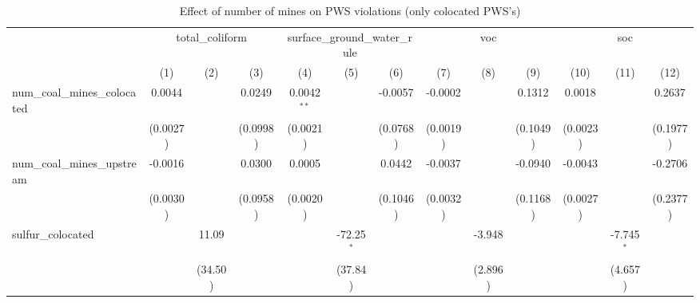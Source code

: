 
\begin{table}[htbp]
   \caption{\label{olsrf2sls_nummine_non_mine_vio_binary_1985to2005colocate} Effect of number of mines on PWS violations (only colocated PWS's)}
   \bigskip
   \centering
   \begin{adjustbox}{width = \textwidth, center}
      \begin{tabular}{lcccccccccccc}
         \toprule
          & \multicolumn{3}{c}{total\_coliform} & \multicolumn{3}{c}{surface\_ground\_water\_rule} & \multicolumn{3}{c}{voc} & \multicolumn{3}{c}{soc}\\
                                                            & (1)           & (2)           & (3)           & (4)           & (5)           & (6)                   & (7)           & (8)           & (9)           & (10)          & (11)           & (12)\\  
         \midrule 
         num\_coal\_mines\_colocated                        & 0.0044        &               & 0.0249        & 0.0042$^{**}$ &               & -0.0057               & -0.0002       &               & 0.1312        & 0.0018        &                & 0.2637\\   
                                                            & (0.0027)      &               & (0.0998)      & (0.0021)      &               & (0.0768)              & (0.0019)      &               & (0.1049)      & (0.0023)      &                & (0.1977)\\   
         num\_coal\_mines\_upstream                         & -0.0016       &               & 0.0300        & 0.0005        &               & 0.0442                & -0.0037       &               & -0.0940       & -0.0043       &                & -0.2706\\   
                                                            & (0.0030)      &               & (0.0958)      & (0.0020)      &               & (0.1046)              & (0.0032)      &               & (0.1168)      & (0.0027)      &                & (0.2377)\\   
         sulfur\_colocated                                  &               & 11.09         &               &               & -72.25$^{*}$  &                       &               & -3.948        &               &               & -7.745$^{*}$   &   \\   
                                                            &               & (34.50)       &               &               & (37.84)       &                       &               & (2.896)       &               &               & (4.657)        &   \\   

\end{tabular}
\end{adjustbox}
\end{table}
